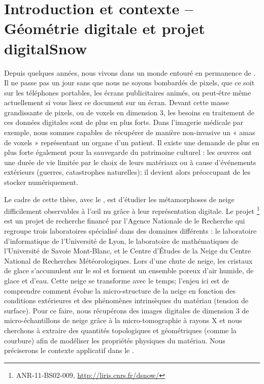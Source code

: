 %
\chapter{Introduction et contexte -- Géométrie digitale et projet digitalSnow}
\label{sec:introduction}


\setcounter{minitocdepth}{3}
\minitoc

\newpage

Depuis quelques années, nous vivons dans un monde entouré en permanence de
. Il ne passe pas un jour sans que nous ne soyons
bombardés de pixels, que ce soit sur les téléphones portables, les écrans
publicitaires animés, ou peut-être même actuellement si vous lisez ce document
sur un écran. Devant cette masse grandissante de pixels, ou de voxels en
dimension 3, les besoins en traitement de ces données digitales sont de plus en
plus forts. Dans l'imagerie médicale par exemple, nous sommes capables de
récupérer de manière non-invasive un « amas de voxels » représentant un organe
d'un patient. Il existe une demande de plus en plus forte également pour la
sauvegarde du patrimoine culturel : les œuvres ont une durée de vie limitée par
le choix de leurs matériaux ou à cause d’événements extérieurs (guerres,
catastrophes naturelles); il devient alors préoccupant de les stocker
numériquement.

Le cadre de cette thèse, avec le , est d'étudier
les métamorphoses de neige difficilement observables à l'œil nu grâce à leur
représentation digitale. Le projet \digitalSnow\footnote{ANR-11-BS02-009,
\url{http://liris.cnrs.fr/dsnow/}} est un projet de recherche financé par
l'Agence Nationale de le Recherche qui regroupe trois laboratoires spécialisé
dans des domaines différents : le laboratoire d'informatique
\textsc{} de l'Université de Lyon, le laboratoire de
mathématiques \textsc{} de l'Université de Savoie Mont-Blanc, et
le Centre d'Études de la Neige \textsc{} du Centre National de
Recherches Météorologiques. Lors d'une chute de neige, les cristaux de glace
s'accumulent sur le sol et forment un ensemble poreux d'air humide, de glace et
d'eau. Cette neige se transforme avec le temps; l'enjeu ici est de comprendre
comment évolue la micro-structure de la neige en fonction des conditions
extérieures et des phénomènes intrinsèques du matériau (tension de surface). Pour
ce faire, nous récupérons des images digitales de dimension 3 de
micro-échantillons de neige grâce à la micro-tomographie à rayons X et nous
cherchons à extraire des quantités topologiques et géométriques (comme la
courbure) afin de modéliser les propriétés physiques du matériau. Nous
préciserons le contexte applicatif dans le
.

